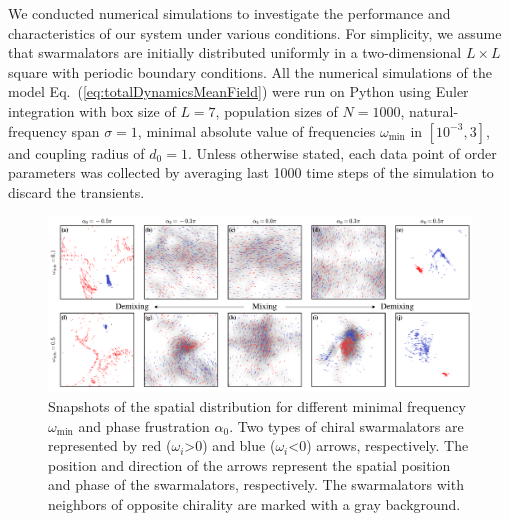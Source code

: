 \documentclass{article}
\begin{document}
We conducted numerical simulations to investigate the performance and characteristics of our system under various conditions.
For simplicity, we assume that swarmalators are initially distributed uniformly in a two-dimensional $L\times L$ square with periodic boundary conditions.
All the numerical simulations of the model Eq.~(\ref{eq:totalDynamicsMeanField}) were run on Python using Euler integration with box size of $L=7$, population sizes of $N=1000$, natural-frequency span $\sigma=1$, minimal absolute value of frequencies $\omega_{\min}$ in $\left[ 10^{-3}, 3 \right]$, and coupling radius of $d_0=1$. 
Unless otherwise stated, each data point of order parameters was collected by averaging last 1000 time steps of the simulation to discard the transients.


\begin{figure}
    \includegraphics[width=\textwidth]{./figs/snapshots.pdf}
    \caption{
        \label{fig:snapshots} Snapshots of the spatial distribution for different minimal frequency $\omega_{\min}$ and phase frustration $\alpha_0$. 
        Two types of chiral swarmalators are represented by red ($\omega_i$>0) and blue ($\omega_i$<0) arrows, respectively.
        The position and direction of the arrows represent the spatial position and phase of the swarmalators, respectively. The swarmalators with neighbors of opposite chirality are marked with a gray background.
    }
\end{figure}
\end{document}
